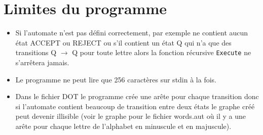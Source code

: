 \documentclass{article}
\begin{document}
\section{Limites du programme}
\begin{itemize}
    \item Si l'automate n'est pas défini correctement, par exemple ne contient aucun état ACCEPT ou REJECT ou s'il contient un état Q qui n'a que des transitions Q $\rightarrow$ Q pour toute lettre alors la fonction récursive \lstinline{Execute} ne s'arrêtera jamais.
    \item Le programme ne peut lire que 256 caractères sur stdin à la fois.
    \item Dans le fichier DOT le programme crée une arête pour chaque transition donc si l'automate contient beaucoup de transition entre deux états le graphe créé peut devenir illisible (voir le graphe pour le fichier words.aut où il y a une arête pour chaque lettre de l'alphabet en minuscule et en majuscule).
\end{itemize}
\end{document}

